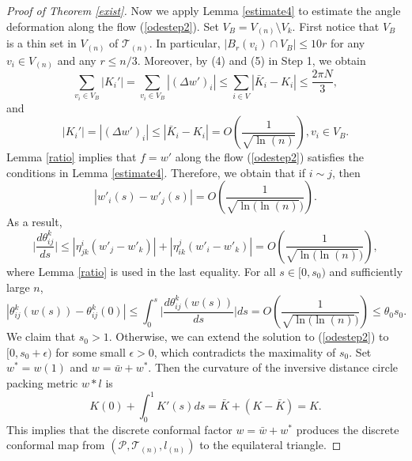 \documentclass[12pt]{amsart}
\begin{document}
\begin{proof}[Proof of Theorem \ref{exist}]

    Now we apply Lemma \ref{estimate4} to estimate the angle deformation along the flow (\ref{odestep2}).
    Set $V_B=V_{(n)}\setminus V_k$.
    First notice that $V_B$ is a thin set in $V_{(n)}$ of $\mathcal{T}_{(n)}$. In particular,  $|{B_r}(v_i) \cap {V_B}| \le 10r$ for
    any $v_i\in V_{(n)}$ and any $r \le n/3$. Moreover, by (4) and (5) in Step 1, we obtain
    $$\sum\limits_{v_i \in {V_B}} | {K_{i}'}| =\sum\limits_{v_i \in {V_B}} | {(\Delta w')_i}| \le \sum\limits_{i\in V} | {{\bar K}_i} - K_i| \le \frac{{2\pi N}}{3},$$ and
    $$|{K_{i}'}|= |{(\Delta w')_i}|  \le |{{\bar K}_i} - K_i| = O(\frac{1}{{\sqrt {\ln (n)} }}) ,v_i \in {V_B} .$$
    Lemma \ref{ratio} implies that  $f = w'$ along the flow (\ref{odestep2}) satisfies the conditions in Lemma \ref{estimate4}. Therefore, we obtain that if $i \sim j$, then
    $$ |{w'_i}(s) - {w'_j}(s)| = O(\frac{1}{{\sqrt {\ln(\ln (n)}) }}).$$
As a result,
    $$ \Big|\frac{{d\theta _{ij}^k}}{{ds}}\Big| \le |\eta _{jk}^i({w'_j} - {{w'}_k})| + |\eta _{ik}^j({w'_i} - {{w'}_k})|  = O(\frac{1}{{\sqrt {\ln(\ln (n)}) }}), $$
    where Lemma \ref{ratio} is used in the last equality.
    For all $s \in [0,{s_0})$ and sufficiently large $n$,
    \begin{equation*}|\theta _{ij}^k(w(s)) - \theta _{ij}^k(0)| \le \int_0^s \Big| \frac{{d\theta _{ij}^k(w(s))}}{{ds}}\Big|ds = O(\frac{1}{{\sqrt {\ln(\ln (n)}) }}) \le \theta_0 s_0.
    \end{equation*}
    We claim that ${s_0} > 1$. Otherwise, we can extend the solution to (\ref{odestep2}) to $[0, s_0+\epsilon)$ for some small $\epsilon>0$, which contradicts the maximality of $s_0$. Set $w^*=w(1)$ and $w = \bar w + w^*$. Then the curvature of the inversive distance circle packing metric $w*l$ is $$K(0)+\int^1_0 K'(s)ds=\bar{K}+(K-\bar{K})=K.$$
    This implies that the discrete conformal factor $w = \bar w +w^*$ produces the discrete conformal map from $(\mathcal{P}, \mathcal{T}_{(n)}, l_{(n)})$ to the equilateral triangle.
    \end{proof}
\end{document}
